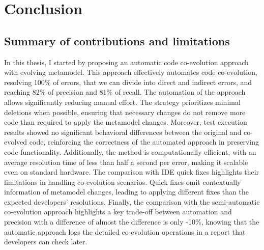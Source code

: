 \chapter*{Conclusion}

\section{ Summary of contributions and limitations}
In this thesis, I started by proposing an automatic code co-evolution approach with evolving metamodel.
This approach effectively automates code co-evolution, resolving 100\% of errors, that we can divide into direct and indirect errors, and reaching 82\% of precision and 81\% of recall. The automation of the approach allows significantly reducing manual effort. The strategy prioritizes minimal deletions when possible, ensuring that necessary changes do not remove more code than required to apply the metamodel changes. Moreover, test execution results showed no significant behavioral differences between the original and co-evolved code, reinforcing the correctness of the automated approach in preserving code functionality. Additionally, the method is computationally efficient, with an average resolution time of less than half a second per error, making it scalable even on standard hardware. The comparison with IDE quick fixes highlights their limitations in handling co-evolution scenarios. Quick fixes omit contextually information of  metamodel changes, leading to applying different fixes than the expected developers' resolutions.
Finally, the comparison with the semi-automatic co-evolution approach \cite{Khelladi2020} highlights a key trade-off between automation and precision with a difference of almost the difference is only -10\%, knowing that the automatic approach logs the detailed co-evolution operations in a report that developers can check later. 



